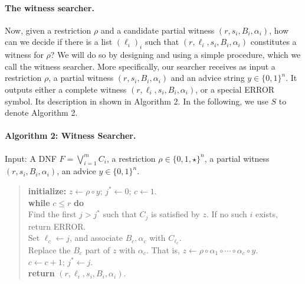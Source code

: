 \documentclass[10pt,a4paper]{article}
\begin{document}
\paragraph{The witness searcher.} Now, given a restriction $\rho$ and a candidate partial witness $(r,s_i,B_i,\alpha_i)$, how can we decide if there is a list $(\ell_i)_i$ such that $(r,\ell_i,s_i,B_i,\alpha_i)$ constitutes a witness for $\rho$? We will do so by designing and using a simple procedure, which we call the witness searcher. More specifically, our searcher receives as input a restriction $\rho$, a partial witness $(r,s_i,B_i,\alpha_i)$ and an advice string $y\in\{0,1\}^n$. It outputs either a complete witness $(r,\ell_i,s_i,B_i,\alpha_i)$, or a special ERROR symbol. Its description in shown in Algorithm 2. In the following, we use $S$ to denote Algorithm 2.
\paragraph{Algorithm 2: Witness Searcher.} Input: A DNF $F=\bigvee_{i=1}^mC_i$, a restriction $\rho\in\{0,1,\star\}^n$, a partial witness $(r,s_i,B_i,\alpha_i)$, an advice $y\in\{0,1\}^n$.
\begin{quote}\textbf{initialize:} $z\leftarrow\rho\circ y$; $j^*\leftarrow0$; $c\leftarrow1$.\\
\textbf{while} $c\le r$ \textbf{do}\\
\hspace*{1em}Find the first $j>j^*$ such that $C_j$ is satisfied by $z$. If no such $i$ exists, return ERROR.\\
\hspace*{1em}Set $\ell_c\leftarrow j$, and associate $B_c,\alpha_c$ with $C_{\ell_c}$.\\
\hspace*{1em}Replace the $B_c$ part of $z$ with $\alpha_c$. That is, $z\leftarrow\rho\circ\alpha_1\circ\cdots\circ\alpha_c\circ y$.\\
\hspace*{1em}$c\leftarrow c+1$; $j^*\leftarrow j$.\\
\textbf{return} $(r,\ell_i,s_i,B_i,\alpha_i)$.\end{quote}
\end{document}
